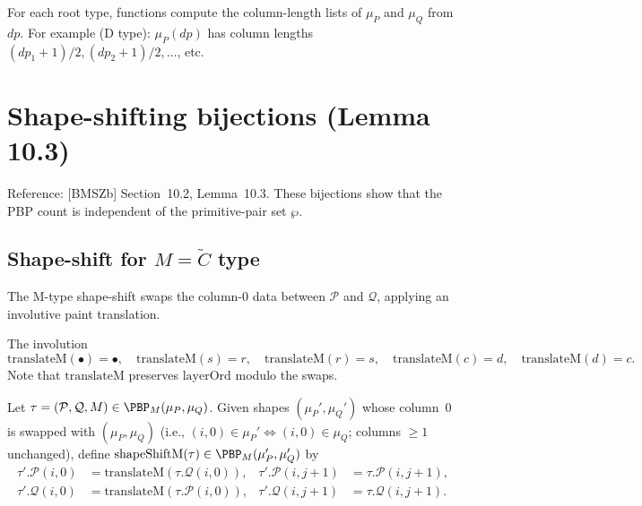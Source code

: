 \begin{definition}
  \label{def:dpartColLens}
  \leanok
  For each root type, functions compute the column-length lists of $\mu_P$ and $\mu_Q$ from $dp$. For example (D type): $\mu_P(dp)$ has column lengths $(dp_1 + 1)/2, (dp_2 + 1)/2, \ldots$, etc.
\end{definition}


\chapter{Shape-shifting bijections (Lemma 10.3)}
\label{chap:shape_shift}

Reference: [BMSZb] Section~10.2, Lemma~10.3. These bijections show that the
PBP count is independent of the primitive-pair set $\wp$.

\section{Shape-shift for $M = \tilde{C}$ type}

The M-type shape-shift swaps the column-0 data between $\mathcal{P}$ and
$\mathcal{Q}$, applying an involutive paint translation.

\begin{definition}
  \label{def:translateM}
  \leanok
  The involution
  \[ \mathrm{translateM}(\bullet) = \bullet,\quad \mathrm{translateM}(s) = r,\quad \mathrm{translateM}(r) = s,\quad \mathrm{translateM}(c) = d,\quad \mathrm{translateM}(d) = c. \]
  Note that $\mathrm{translateM}$ preserves $\mathrm{layerOrd}$ modulo the swaps.
\end{definition}

\begin{definition}
  \label{def:shapeShiftM}
  \leanok
  Let $\tau = (\mathcal{P}, \mathcal{Q}, M) \in \PBP_M(\mu_P, \mu_Q)$. Given
  shapes $(\mu_P', \mu_Q')$ whose column~0 is swapped with $(\mu_P, \mu_Q)$
  (i.e., $(i, 0) \in \mu_P' \iff (i, 0) \in \mu_Q$; columns $\geq 1$ unchanged),
  define $\mathrm{shapeShiftM}(\tau) \in \PBP_M(\mu_P', \mu_Q')$ by
  \begin{align*}
    \tau'.\mathcal{P}(i, 0) &= \mathrm{translateM}(\tau.\mathcal{Q}(i, 0)), &
    \tau'.\mathcal{P}(i, j+1) &= \tau.\mathcal{P}(i, j+1), \\
    \tau'.\mathcal{Q}(i, 0) &= \mathrm{translateM}(\tau.\mathcal{P}(i, 0)), &
    \tau'.\mathcal{Q}(i, j+1) &= \tau.\mathcal{Q}(i, j+1).
  \end{align*}
\end{definition}

